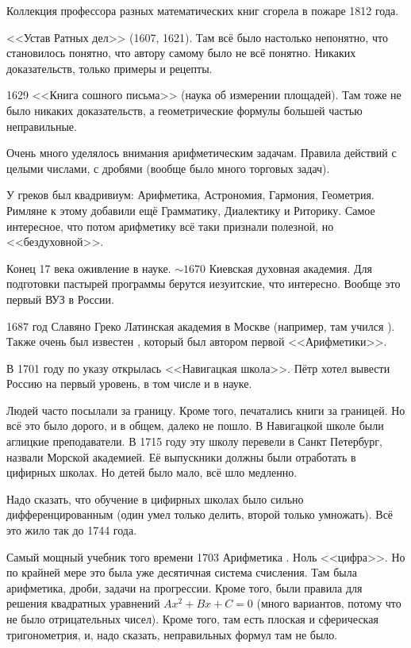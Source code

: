 \documentclass[a4paper,oneside,fleqn,10pt]{article}
\begin{document}
Коллекция профессора  разных математических книг сгорела
в пожаре 1812 года.

<<Устав Ратных дел>> (1607, 1621). Там всё было настолько непонятно,
что становилось понятно, что автору самому было не всё
понятно. Никаких доказательств, только примеры и рецепты.

1629 <<Книга сошного письма>> (наука об измерении площадей).  Там тоже
не было никаких доказательств, а геометрические формулы большей частью
неправильные.

Очень много уделялось внимания арифметическим задачам.  Правила
действий с целыми числами, с дробями (вообще было много торговых
задач).

У греков был квадривиум: Арифметика, Астрономия, Гармония, Геометрия.
Римляне к этому добавили ещё Грамматику, Диалектику и Риторику.  Самое
интересное, что потом арифметику всё таки признали полезной, но
<<бездуховной>>.

Конец 17 века оживление в науке. $\sim1670$ Киевская духовная
академия.  Для подготовки пастырей программы берутся иезуитские, что
интересно.  Вообще это первый ВУЗ в России.

1687 год Славяно Греко Латинская академия в Москве (например, там
учился ). Также очень был известен
, который был автором первой <<Арифметики>>.

В 1701 году по указу  открылась
<<Навигацкая школа>>.  Пётр хотел вывести Россию на первый уровень, в
том числе и в науке.

Людей часто посылали за границу. Кроме того, печатались книги за
границей.  Но всё это было дорого, и в общем, далеко не пошло.  В
Навигацкой школе были аглицкие преподаватели.  В 1715 году эту школу
перевели в Санкт Петербург, назвали Морской академией.  Её выпускники
должны были отработать в цифирных школах.  Но детей было мало, всё шло
медленно.

Надо сказать, что обучение в цифирных школах было сильно
дифференцированным (один умел только делить, второй только умножать).
Всё это жило так до 1744 года.

Самый мощный учебник того времени 1703 Арифметика
.  Ноль <<цифра>>. Но по крайней мере это
была уже десятичная система счисления.  Там была арифметика, дроби,
задачи на прогрессии. Кроме того, были правила для решения квадратных
уравнений $Ax^2 + Bx + C=0$ (много вариантов, потому что не было
отрицательных чисел). Кроме того, там есть плоская и сферическая
тригонометрия, и, надо сказать, неправильных формул там не было.
\end{document}

